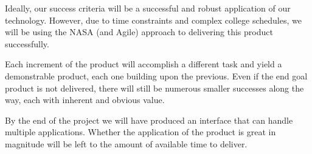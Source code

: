 Ideally, our success criteria will be a successful and robust application of our \productname{} technology. However, due to time constraints and complex college schedules, we will be using the NASA (and Agile) approach to delivering this product successfully. 

Each increment of the product will accomplish a different task and yield a demonstrable product, each one building upon the previous. Even if the end goal product is not delivered, there will still be numerous smaller successes along the way, each with inherent and obvious value.

By the end of the project we will have produced an interface that can handle multiple applications. Whether the application of the product is great in magnitude will be left to the amount of available time to deliver.